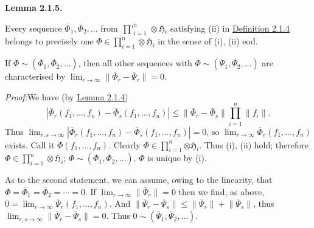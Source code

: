 \documentclass[12pt,b5paper,twoside]{article}
\newcommand{\Hspace}{\mathfrak H}
\newcommand{\Lemma}[1]{%
  \par\smallskip\noindent\phantomsection\label{lem:#1}\textbf{Lemma #1.}\enspace
}
\newcommand{\Proof}{\par\noindent\textit{Proof:}\enspace}
\newcommand{\defref}[1]{\hyperref[def:#1]{Definition #1}}
\newcommand{\lemref}[1]{\hyperref[lem:#1]{Lemma #1}}
\begin{document}
\Lemma{2.1.5}
Every sequence $\overline{\Phi}_1,\overline{\Phi}_2,\ldots$ from
$\mathop{\prod\nolimits'}_{i=1}^{n}\otimes\Hspace_i$ satisfying (ii) in
\defref{2.1.4} belongs to precisely one
$\Phi\in\prod_{i=1}^{n}\otimes\Hspace_i$ in the sense of (i), (ii) eod.

If $\Phi\sim(\overline{\Phi}_1,\overline{\Phi}_2,\ldots)$, then all other
sequences with $\Phi\sim(\overline{\Psi}_1,\overline{\Psi}_2,\ldots)$ are
characterised by
$\lim_{r\to\infty}\lVert\overline{\Phi}_r-\overline{\Psi}_r\rVert=0$.

\Proof We have (by \lemref{2.1.4})
\[
 |\overline{\Phi}_r(f_1,\ldots,f_n)
 -\overline{\Phi}_s(f_1,\ldots,f_n)|
 \leq\lVert\overline{\Phi}_r-\overline{\Phi}_s\rVert
 \prod_{i=1}^{n}\lVert f_i\rVert.
\]
Thus
$\lim_{r,s\to\infty}|\overline{\Phi}_r(f_1,\ldots,f_n)-
\overline{\Phi}_s(f_1,\ldots,f_n)|=0$, so
$\lim_{r\to\infty}\overline{\Phi}_r(f_1,\ldots,f_n)$ exists. Call it
$\Phi(f_1,\ldots,f_n)$. Clearly
$\Phi\in\prod_{i=1}^{n}\bm{\otimes}\Hspace_i$. Thus (i), (ii) hold; therefore
$\Phi\in\prod_{i=1}^{n}\otimes\Hspace_i$;
$\Phi\sim(\overline{\Phi}_1,\overline{\Phi}_2,\ldots)$.
$\Phi$ is unique by (i).

As to the second statement, we can assume, owing to the linearity, that
$\Phi=\overline{\Phi}_1=\overline{\Phi}_2=\cdots=0$. If
$\lim_{r\to\infty}\lVert\overline{\Psi}_r\rVert=0$ then we find, as above,
$0=\lim_{r\to\infty}\overline{\Psi}_r(f_1,\ldots,f_n)$. And
$\lVert\overline{\Psi}_r-\overline{\Psi}_s\rVert
\leq\lVert\overline{\Psi}_r\rVert+
\lVert\overline{\Psi}_s\rVert$, thus
$\lim_{r,s\to\infty}\lVert\overline{\Psi}_r-
\overline{\Psi}_s\rVert=0$. Thus
$0\sim(\overline{\Psi}_1,\overline{\Psi}_2,\ldots)$.
\end{document}
